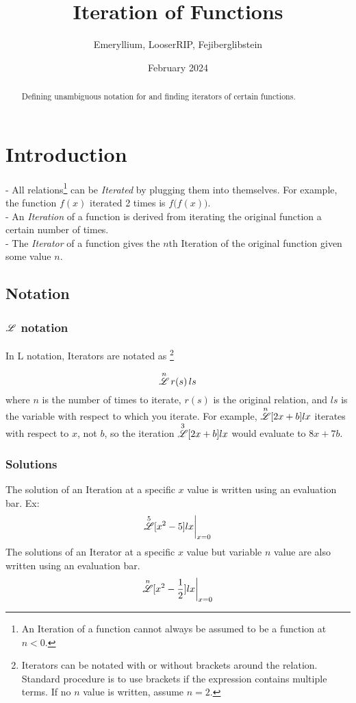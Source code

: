 \documentclass[12pt, letterpaper]{article}
\title{Iteration of Functions}
\author{Emeryllium, LooserRIP, Fejiberglibstein}
\date{February 2024}
\begin{document}

\maketitle

\begin{abstract}
    Defining unambiguous notation for and finding iterators of certain functions.
\end{abstract}

\tableofcontents
\newpage

\section{Introduction}


- All relations\footnote{An Iteration of a function cannot always be assumed to be a function at $n<0$.} can be \textit{Iterated} by plugging them into themselves. For example, the function $f(x)$ iterated 2 times is $f\big(f(x)\big)$. 
\\
- An \textit{Iteration} of a function is derived from iterating the original function a certain number of times.
\\
- The \textit{Iterator} of a function gives the $n$th Iteration of the original function given some value $n$.


\subsection{Notation}

\subsubsection{$\overset{}{\mathscr{L}}$ notation}
In L notation, Iterators are notated as
    \footnote{Iterators can be notated with or without brackets around the relation. Standard procedure is to use brackets if the expression contains multiple terms. If no $n$ value is written, assume $n=2$.}

$$ \overset{n}{\mathscr{L}} \, r(s) \, ls$$
where $n$ is the number of times to iterate, $r(s)$ is the original relation, and $ls$ is the variable with respect to which you iterate. For example, $\overset{n}{\mathscr{L}} [2x+b] lx$
iterates with respect to $x$, not $b$, so the iteration $\overset{3}{\mathscr{L}} [2x+b] lx$ would evaluate to $8x+7b$.

\subsubsection{Solutions}
The solution of an Iteration at a specific $x$ value is written using an evaluation bar. Ex:
$$\overset{5}{\mathscr{L}}[x^2-5]lx\bigg|_{x=0}$$
The solutions of an Iterator at a specific $x$ value but variable $n$ value are also written using an evaluation bar.
$$\overset{n}{\mathscr{L}}[x^2-\frac{1}{2}]lx\bigg|_{x=0}$$
\end{document}
